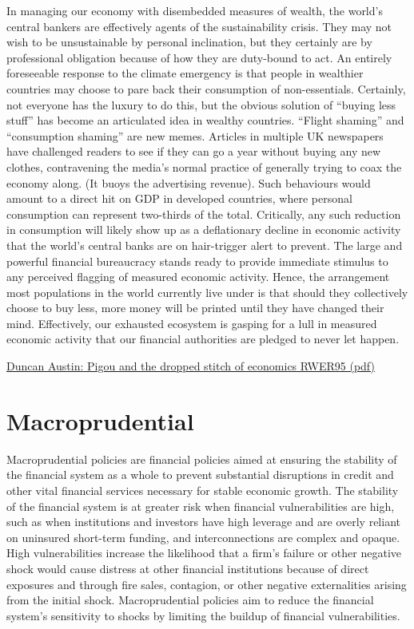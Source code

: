 \documentclass[
]{book}
\begin{document}
In managing our economy with disembedded measures of wealth,
the world's central bankers are effectively agents of the sustainability crisis. They may not
wish to be unsustainable by personal inclination, but they certainly are by professional
obligation because of how they are duty-bound to act.
An entirely foreseeable response to the climate emergency is that people in wealthier
countries may choose to pare back their consumption of non-essentials. Certainly, not
everyone has the luxury to do this, but the obvious solution of ``buying less stuff'' has become
an articulated idea in wealthy countries. ``Flight shaming'' and ``consumption shaming'' are new
memes. Articles in multiple UK newspapers have challenged readers to see if they can go a
year without buying any new clothes, contravening the media's normal practice of generally
trying to coax the economy along. (It buoys the advertising revenue).
Such behaviours would amount to a direct hit on GDP in developed countries, where personal
consumption can represent two-thirds of the total. Critically, any such reduction in
consumption will likely show up as a deflationary decline in economic activity that the world's
central banks are on hair-trigger alert to prevent. The large and powerful financial
bureaucracy stands ready to provide immediate stimulus to any perceived flagging of
measured economic activity.
Hence, the arrangement most populations in the world currently live under is that should they
collectively choose to buy less, more money will be printed until they have changed their
mind. Effectively, our exhausted ecosystem is gasping for a lull in measured economic activity
that our financial authorities are pledged to never let happen.

\href{pdf/Austin_2021_Pigou_\%20and_the_dropped_stitch_of_economics_RWER95.pdf}{Duncan Austin: Pigou and the dropped stitch of economics RWER95 (pdf)}

\hypertarget{macroprudential}{%
\section{Macroprudential}\label{macroprudential}}

Macroprudential policies are financial policies aimed at ensuring the stability of the financial system as a whole to prevent substantial disruptions in credit and other vital financial services necessary for stable economic growth. The stability of the financial system is at greater risk when financial vulnerabilities are high, such as when institutions and investors have high leverage and are overly reliant on uninsured short-term funding, and interconnections are complex and opaque. High vulnerabilities increase the likelihood that a firm's failure or other negative shock would cause distress at other financial institutions because of direct exposures and through fire sales, contagion, or other negative externalities arising from the initial shock. Macroprudential policies aim to reduce the financial system's sensitivity to shocks by limiting the buildup of financial vulnerabilities.
\end{document}

